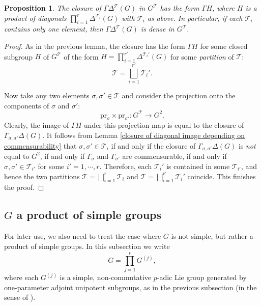 \documentclass[11pt,oneside,reqno]{amsart}
\theoremstyle{plain}
\newtheorem{proposition}[theorem]{Proposition}
\begin{document}
	\begin{proposition}\label{closure of diagonal map}
		The closure of $\Gamma\Delta^{\mathcal{T}}(G)$ in $G^{\mathcal{T}}$ has the form $\Gamma H$, where $H$ is a product of diagonals $\prod_{i=1}^r\Delta^{\mathcal{T}_i}(G)$ with $\mathcal{T}_i$ as above. In particular, if each $\mathcal{T}_i$ contains only one element, then $\Gamma\Delta^{\mathcal{T}}(G)$ is dense in $G^{\mathcal{T}}$.
	\end{proposition}
	\begin{proof}
		As in the previous lemma, the closure has the form $\Gamma H$ for some closed subgroup $H$ of $G^{\mathcal{T}}$ of the form
		$H=\prod_{i=1}^{r'}\Delta^{\mathcal{T}_i'}(G)$
		for some \textit{partition} of $\mathcal{T}$:
		\[
		\mathcal{T}=\bigsqcup_{i=1}^{r'}\mathcal{T}_i'.
		\]
		
		
		
		Now take any two elements $\sigma,\sigma'\in\mathcal{T}$ and consider the projection onto the components of $\sigma$ and $\sigma'$:
		\[
		\mathrm{pr}_{\sigma}
		\times
		\mathrm{pr}_{\sigma'}
		\colon
		G^{\mathcal{T}}
		\rightarrow
		G^2.
		\]
		Clearly, the image of $\Gamma H$ under this projection map is equal to the closure of $\Gamma_{\sigma,\sigma'}\Delta(G)$.
		It follows from Lemma \ref{closure of diagonal image depending on commensurability} that $\sigma,\sigma'\in\mathcal{T}_i$ if and only if the closure of $\Gamma_{\sigma,\sigma'}\Delta(G)$ is \textit{not} equal to $G^2$, if and only if $\Gamma_{\sigma}$ and $\Gamma_{\sigma'}$ are commensurable, if and only if $\sigma,\sigma'\in\mathcal{T}_{i'}$ for some $i'=1,\cdots,r$.
		Therefore, each $\mathcal{T}_i'$ is contained in some $\mathcal{T}_{i'}$, and hence the two partitions $\mathcal{T}=\bigsqcup_{i=1}^r\mathcal{T}_i$ and $\mathcal{T}=\bigsqcup_{i=1}^{r'}\mathcal{T}_i'$ coincide. This finishes the proof.
	\end{proof}
	
	
	
	\subsection{$G$ a product of simple groups}\label{G not simple}
	For later use, we also need to treat the case where $G$ is not simple, but rather a product of simple groups.
	In this subsection we write
	\[
	G=\prod_{j=1}^t G^{(j)},
	\]
	where each $G^{(j)}$ is a simple, non-commutative $p$-adic Lie group generated by one-parameter adjoint unipotent subgroups, as in the previous subsection (in the sense of \cite{Ratner1995}).
	
\end{document}

